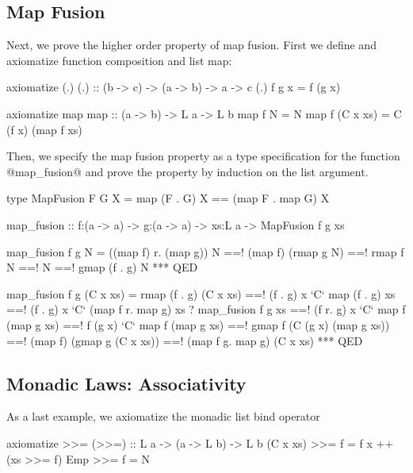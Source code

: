 

\subsection{Map Fusion}\label{subsec:map_fusion}

Next, we prove the higher order property of map fusion.
First we define and axiomatize function composition and
list map:

\begin{code}
  axiomatize (.)
  (.) :: (b -> c) -> (a -> b) -> a -> c
  (.) f g x = f (g x)

  axiomatize map
  map :: (a -> b) -> L a -> L b
  map f N        = N
  map f (C x xs) = C (f x) (map f xs)
\end{code}



Then, we specify the map fusion property as a type
specification for the function @map_fusion@
and prove the property by induction on the list argument.
\begin{code}
  type MapFusion F G X
    = {map (F . G) X == (map F . map G) X}

  map_fusion :: f:(a -> a)
             -> g:(a -> a)
             -> xs:L a
             -> MapFusion f g xs
\end{code}

\begin{code}
  map_fusion f g N
    =   ((map f) r. (map g)) N
    ==! (map f) (rmap g N)
    ==! rmap f N
    ==! N
    ==! gmap (f . g) N
    *** QED

  map_fusion f g (C x xs)
    =   rmap (f . g) (C x xs)
    ==! (f . g) x `C` map (f . g) xs
    ==! (f . g) x `C` (map f r. map g) xs
         ? map_fusion f g xs
    ==! (f r. g) x `C` map f (map g xs)
    ==! f (g x)   `C` map f (map g xs)
    ==! gmap f (C (g x) (map g xs))
    ==! (map f) (gmap g (C x xs))
    ==! (map f g. map g) (C x xs)
    *** QED
\end{code}

\subsection{Monadic Laws: Associativity}
As a last example,
we axiomatize the monadic list bind operator
\begin{code}
  axiomatize >>=
  (>>=) :: L a -> (a -> L b) -> L b
  (C x xs) >>= f = f x ++ (xs >>= f)
  Emp      >>= f = N
\end{code}

